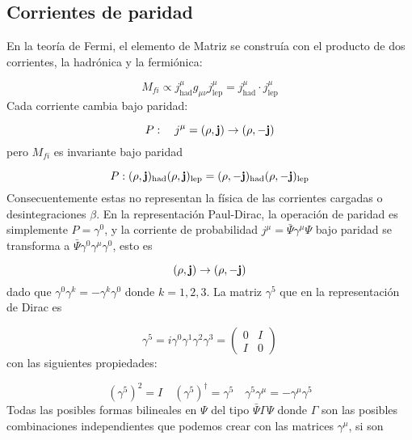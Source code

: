 \subsection{Corrientes de paridad}

En la teoría de Fermi, el elemento de Matriz se construía con el producto de dos corrientes, la hadrónica y la fermiónica:

\begin{equation}
	M_{fi} \propto j^{\mu}_{\text{had}} g_{\mu \nu} j^{\mu}_{\text{lep}} = j^{\mu}_{\text{had}} \cdot j^{\mu}_{\text{lep}}
\end{equation}
Cada corriente cambia bajo paridad: 

\begin{equation}
	P: \quad j^\mu = (\rho,\mathbf{j}) \rightarrow (\rho,-\mathbf{j})
\end{equation}
pero $M_{fi}$ es invariante bajo paridad

\begin{equation}
	P:  (\rho,\mathbf{j})_{\text{had}} (\rho,\mathbf{j})_{\text{lep}} = (\rho,-\mathbf{j})_{\text{had}}  (\rho,-\mathbf{j})_{\text{lep}}
\end{equation}
Consecuentemente estas no representan la física de las corrientes cargadas o desintegraciones $\beta$. En la representación Paul-Dirac, la operación de paridad es simplemente $P=\gamma^0$, y la corriente de probabilidad $j^\mu = \bar{\Psi} \gamma^\mu \Psi$ bajo paridad se transforma a $\bar{\Psi}\gamma^0 \gamma^\mu \gamma^0$, esto es

\begin{equation}
	(\rho,\mathbf{j}) \rightarrow (\rho,-\mathbf{j})
\end{equation}
dado que $\gamma^0 \gamma^k = - \gamma^k \gamma^0$ donde $k=1,2,3$. La matriz $\gamma^5$ que en la representación de Dirac es

\begin{equation}
	\gamma^5 = i \gamma^0\gamma^1\gamma^2\gamma^3 = \begin{pmatrix}
		0 & I \\ I & 0
	\end{pmatrix}
\end{equation}
con las siguientes propiedades:

\begin{equation}
	(\gamma^5)^2 = I \quad (\gamma^5)^\dagger = \gamma^5 \quad \gamma^5\gamma^\mu = - \gamma^\mu\gamma^5
\end{equation}
Todas las posibles formas bilineales en $\Psi$ del tipo $\bar{\Psi} \Gamma \Psi$ donde $\Gamma$ son las posibles combinaciones independientes que podemos crear con las matrices $\gamma^\mu$, si son

